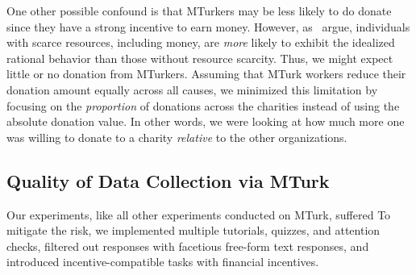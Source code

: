 {{One other possible confound is that MTurkers may be less likely to do donate since they have a strong incentive to earn money.  However, as~\textcite{Shah2015a} argue, individuals with scarce resources, including money, are \textit{more} likely to exhibit the idealized rational behavior than those without resource scarcity. Thus, we might expect little or no donation from MTurkers. Assuming that MTurk workers reduce their donation amount equally across all causes, we minimized this limitation by focusing on the \textit{proportion} of donations across the charities instead of using the absolute donation value. In other words, we were looking at how much more one was willing to donate to a charity \textit{relative} to the other organizations.




}}

\subsection{Quality of Data Collection via MTurk}
Our experiments, like all other experiments conducted on MTurk, suffered {} To mitigate the risk, we implemented multiple tutorials, quizzes, and attention checks, filtered out responses with facetious free-form text responses, and introduced incentive-compatible tasks with financial incentives. {}

